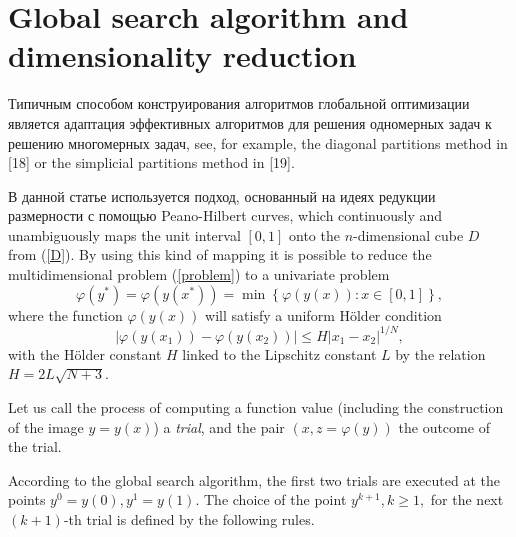 \documentclass[runningheads]{llncs}
\begin{document}


\section{Global search algorithm and dimensionality reduction}

Типичным способом конструирования алгоритмов глобальной оптимизации является адаптация эффективных алгоритмов для решения одномерных задач к решению многомерных задач, see, for example, the diagonal partitions method in [18] or
the simplicial partitions method in [19].

В данной статье используется подход, основанный на идеях редукции размерности с помощью Peano-Hilbert curves, which continuously and unambiguously maps the unit interval $[0,1]$ onto the $n$-dimensional cube $D$ from (\ref{D}). By using this kind of mapping it is possible to reduce the multidimensional problem (\ref{problem}) to a univariate problem
\[
\varphi(y^\ast)=\varphi(y(x^\ast))=\min{\left\{\varphi(y(x)): x\in[0,1]\right\}},
\]
where the function $\varphi(y(x))$ will satisfy a uniform H{\"o}lder condition
\[
\left|\varphi(y(x_1))-\varphi(y(x_2))\right|\leq H\left|x_1-x_2\right|^{1/N},
\]
with the H{\"o}lder constant $H$ linked to the Lipschitz constant $L$ by the relation
$ H=2 L \sqrt{N+3}$.

Let us call the process of computing a function value (including the construction of the image $y=y(x)$) a \textit{trial}, and the pair $(x, z = \varphi(y))$ the outcome of the trial.


According to the global search algorithm, the first two trials are executed at 
the points $y^0=y(0), y^1=y(1)$. The choice of the point $y^{k+1},k\geq 1,$  
for the next $(k+1)$-th trial is defined by the following rules.
\end{document}
